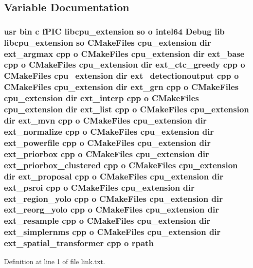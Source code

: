 \subsection{Variable Documentation}
\subsubsection[{\texorpdfstring{rpath}{rpath}}]{\setlength{\rightskip}{0pt plus 5cm}usr bin {\bf c} f\+P\+IC libcpu\+\_\+extension {\bf so} o intel64 Debug lib libcpu\+\_\+extension {\bf so} C\+Make\+Files {\bf cpu\+\_\+extension} dir ext\+\_\+argmax cpp o C\+Make\+Files {\bf cpu\+\_\+extension} dir ext\+\_\+base cpp o C\+Make\+Files {\bf cpu\+\_\+extension} dir ext\+\_\+ctc\+\_\+greedy cpp o C\+Make\+Files {\bf cpu\+\_\+extension} dir ext\+\_\+detectionoutput cpp o C\+Make\+Files {\bf cpu\+\_\+extension} dir ext\+\_\+grn cpp o C\+Make\+Files {\bf cpu\+\_\+extension} dir ext\+\_\+interp cpp o C\+Make\+Files {\bf cpu\+\_\+extension} dir ext\+\_\+list cpp o C\+Make\+Files {\bf cpu\+\_\+extension} dir ext\+\_\+mvn cpp o C\+Make\+Files {\bf cpu\+\_\+extension} dir ext\+\_\+normalize cpp o C\+Make\+Files {\bf cpu\+\_\+extension} dir ext\+\_\+powerfile cpp o C\+Make\+Files {\bf cpu\+\_\+extension} dir ext\+\_\+priorbox cpp o C\+Make\+Files {\bf cpu\+\_\+extension} dir ext\+\_\+priorbox\+\_\+clustered cpp o C\+Make\+Files {\bf cpu\+\_\+extension} dir ext\+\_\+proposal cpp o C\+Make\+Files {\bf cpu\+\_\+extension} dir ext\+\_\+psroi cpp o C\+Make\+Files {\bf cpu\+\_\+extension} dir ext\+\_\+region\+\_\+yolo cpp o C\+Make\+Files {\bf cpu\+\_\+extension} dir ext\+\_\+reorg\+\_\+yolo cpp o C\+Make\+Files {\bf cpu\+\_\+extension} dir ext\+\_\+resample cpp o C\+Make\+Files {\bf cpu\+\_\+extension} dir ext\+\_\+simplernms cpp o C\+Make\+Files {\bf cpu\+\_\+extension} dir ext\+\_\+spatial\+\_\+transformer cpp o rpath}\hypertarget{thirdparty_2extension_2CMakeFiles_2cpu__extension_8dir_2link_8txt_a729b5a564f039d9c21d240895fd7d79d}{}\label{thirdparty_2extension_2CMakeFiles_2cpu__extension_8dir_2link_8txt_a729b5a564f039d9c21d240895fd7d79d}


Definition at line 1 of file link.\+txt.


